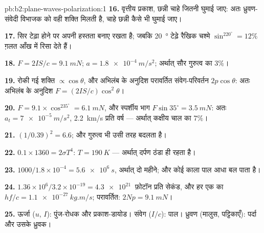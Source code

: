 \begin{solution}{pb:b2:plane-waves-polarization:1}
\textbf{16.} वृत्तीय प्रकाश, छन्नी चाहे जितनी घुमाई जाए: अतः
ध्रुवण-संवेदी विभाजक को वही शक्ति मिलती है, चाहे
छन्नी कैसे भी घुमाई जाए।

\textbf{17.} सिर टेढ़ा होने पर  अपनी हस्तता बनाए रखता
है; जबकि \qty{20}{\degree} टेढ़े रैखिक चश्मे $\sin^220^\circ = 12\%$
ग़लत आँख में रिसा देते हैं।

\textbf{18.} $F = 2IS/c = \qty{9.1}{mN}$; $a = \qty{1.8e-4}{m/s^2}$; अर्थात् सौर
गुरुत्व का $3\%$।

\textbf{19.} रोकी गई शक्ति $\propto\cos\theta$, और अभिलंब के अनुदिश परावर्तित
संवेग-परिवर्तन $2p\cos\theta$: अतः अभिलंब के अनुदिश $F = (2IS/c)\cos^2\theta$।

\textbf{20.} $F = 9.1 \times \cos^235^\circ = \qty{6.1}{mN}$, और स्पर्शीय भाग $F\sin35^\circ
= \qty{3.5}{mN}$: अतः $a_t = \qty{7e-5}{m/s^2}$, \qty{2.2}{km/s} प्रति वर्ष --- अर्थात्
कक्षीय चाल का $7\%$।

\textbf{21.} $(1/0.39)^2 = 6.6$; और गुरुत्व भी उसी तरह बदलता है।

\textbf{22.} $0.1 \times 1360 = 2\sigma T^4$: $T = \qty{190}{K}$ --- अर्थात् दर्पण ठंडा
ही रहता है।

\textbf{23.} $1000/1.8 \times 10^{-4} = \qty{5.6e6}{s}$, अर्थात् दो महीने; और कोई काला पाल
आधा बल पाता है।

\textbf{24.} $1.36 \times 10^6/3.2 \times 10^{-19} = \qty{4.3e21}{}$ फ़ोटॉन प्रति सेकंड,
और हर एक का $hf/c = \qty{1.1e-27}{kg.m/s}$; परावर्तित: $2Np = \qty{9.1}{mN}$।

\textbf{25.} ऊर्जा ($u$, $I$): पुंज-रोधक और प्रकाश-डायोड।
संवेग ($I/c$): पाल। ध्रुवण (मालुस, पट्टिकाएँ):
पर्दा और उसके ध्रुवक।
\end{solution}
